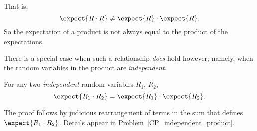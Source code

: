 \iffalse
\begin{align*}
\Expect{R^2}
    & = \sum_{\omega \in \sspace} R^2(\omega) \prob{w} \\
    & = \sum_{i=1}^6 i^2 \cdot \prob{R_i = i} \\
    & = \frac{1^2}{6} + \frac{2^2}{6} + \frac{3^2}{6} +
            \frac{4^2}{6} + \frac{5^2}{6} + \frac{6^2}{6} \\
    & =   15\; 1/6\\
    & \neq  12 \; 1/4.
\end{align*}
\fi

That is,
\[
    \expect{R \cdot R} \neq \expect{R} \cdot \expect{R}.
\]
So the expectation of a product is not always equal to the product of
the expectations.

There is a special case when such a relationship \emph{does} hold
however; namely, when the random variables in the product are
\emph{independent}.

\begin{theorem}\label{th:prod}
For any two \emph{independent} random variables $R_1$, $R_2$,
\[
\expect{R_1 \cdot R_2} = \expect{R_1} \cdot \expect{R_2}.
\]
\end{theorem}

The proof follows by judicious rearrangement of terms in the sum that
defines $\expect{R_1 \cdot R_2}$.  Details appear in
Problem~\ref{CP_independent_product}.

